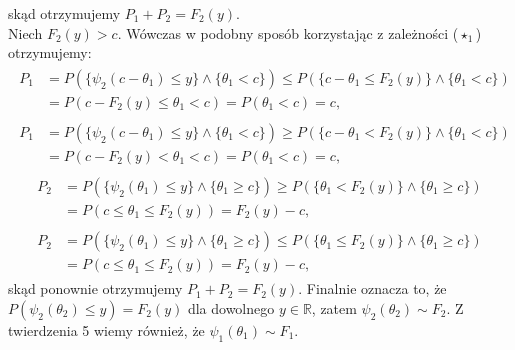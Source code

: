\documentclass[12pt,a4paper,openany]{book}
\begin{document}
\noindent skąd otrzymujemy $P_{1} + P_{2} = F_{2}(y)$.\\
\noindent Niech $F_{2}(y) > c$. Wówczas w podobny sposób korzystając z zależności ($\star_{1}$) otrzymujemy:
\begin{gather}
\begin{split}
P_{1} &= P(\lbrace \psi_{2}(c-\theta_{1}) \leqslant y \rbrace  \wedge \lbrace \theta_{1} < c \rbrace)  \leqslant P(\lbrace c-\theta_{1} \leqslant F_{2}(y) \rbrace  \wedge \lbrace \theta_{1} < c \rbrace) \\
&= P(c - F_{2}(y) \leqslant \theta_{1} < c) = P(\theta_{1} < c) = c, \nonumber
\end{split}
\end{gather}
\begin{gather}
\begin{split}
P_{1} &= P(\lbrace \psi_{2}(c-\theta_{1}) \leqslant y \rbrace  \wedge \lbrace \theta_{1} < c \rbrace)  \geqslant P(\lbrace c-\theta_{1} < F_{2}(y) \rbrace  \wedge \lbrace \theta_{1} < c \rbrace) \\
&= P(c - F_{2}(y) < \theta_{1} < c) = P(\theta_{1} < c) = c, \nonumber
\end{split}
\end{gather}
\begin{gather}
\begin{split}
P_{2} &= P(\lbrace \psi_{2}(\theta_{1}) \leqslant y \rbrace  \wedge \lbrace \theta_{1} \geqslant c \rbrace)  \geqslant P(\lbrace \theta_{1} < F_{2}(y) \rbrace  \wedge \lbrace \theta_{1} \geqslant c \rbrace) \\
&= P(c \leqslant \theta_{1} \leqslant F_{2}(y)) = F_{2}(y) - c, \nonumber
\end{split}
\end{gather}
\begin{gather}
\begin{split}
P_{2} &= P(\lbrace \psi_{2}(\theta_{1}) \leqslant y \rbrace  \wedge \lbrace \theta_{1} \geqslant c \rbrace)  \leqslant P(\lbrace \theta_{1} \leqslant F_{2}(y) \rbrace  \wedge \lbrace \theta_{1} \geqslant c \rbrace) \\
&= P(c \leqslant \theta_{1} \leqslant F_{2}(y)) = F_{2}(y) - c, \nonumber
\end{split}
\end{gather}
\noindent skąd ponownie otrzymujemy $P_{1} + P_{2} = F_{2}(y)$. Finalnie oznacza to, że $P(\psi_{2}(\theta_{2}) \leqslant y) = F_{2}(y)$ dla dowolnego $y \in \mathbb{R}$, zatem $\psi_{2}(\theta_{2}) \sim F_{2}$. Z twierdzenia 5 wiemy również, że $\psi_{1}(\theta_{1}) \sim F_{1}$.   \\
\end{document}
